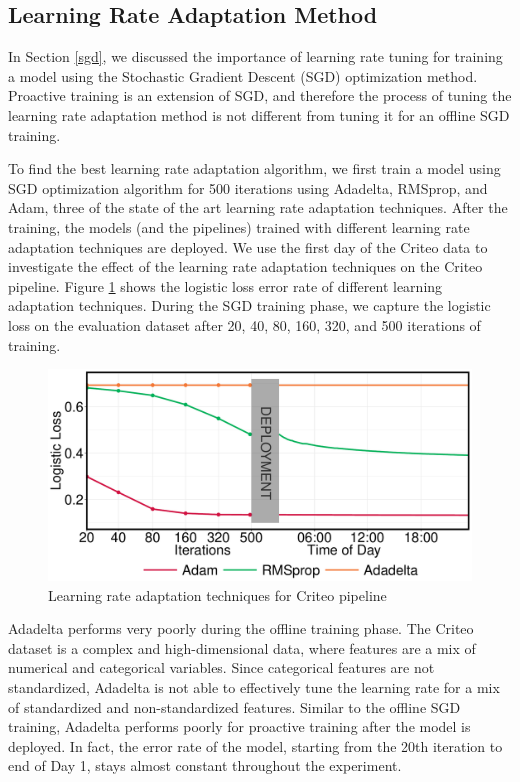 \subsection{Learning Rate Adaptation Method}
In Section \ref{sgd}, we discussed the importance of learning rate tuning for training a model using the Stochastic Gradient Descent (SGD) optimization method.
Proactive training is an extension of SGD, and therefore the process of tuning the learning rate adaptation method is not different from tuning it for an offline SGD training.

To find the best learning rate adaptation algorithm, we first train a model using SGD optimization algorithm for 500 iterations using Adadelta, RMSprop, and Adam, three of the state of the art learning rate adaptation techniques.
After the training, the models (and the pipelines) trained with different learning rate adaptation techniques are deployed.
We use the first day of the Criteo data to investigate the effect of the learning rate adaptation techniques on the Criteo pipeline.
Figure \ref{fig:criteo-learning-rate} shows the logistic loss error rate of different learning adaptation techniques. 
During the SGD training phase, we capture the logistic loss on the evaluation dataset after 20, 40, 80, 160, 320, and 500 iterations of training.


\begin{figure}[h!]
\includegraphics[width=\columnwidth]{../images/experiment-results/criteo-learning-rate-experiment.pdf}
\caption{Learning rate adaptation techniques for Criteo pipeline}
\label{fig:criteo-learning-rate}
\end{figure}

Adadelta performs very poorly during the offline training phase.
The Criteo dataset is a complex and high-dimensional data, where features are a mix of numerical and categorical variables.
Since categorical features are not standardized, Adadelta is not able to effectively tune the learning rate for a mix of standardized and non-standardized features.
Similar to the offline SGD training, Adadelta performs poorly for proactive training after the model is deployed.
In fact, the error rate of the model, starting from the 20th iteration to end of Day 1, stays almost constant throughout the experiment.

